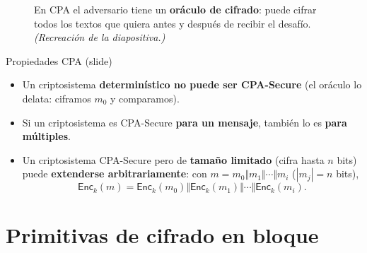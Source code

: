 \documentclass[11pt,a4paper]{article}
\newcommand{\Enc}{\mathsf{Enc}}
\DeclareMathOperator{\negl}{negl}
\newcommand{\E}{\mathsf{e}}
\begin{document}
\begin{figure}[h]
\centering
{}
\caption{En CPA el adversario tiene un \textbf{oráculo de cifrado}: puede cifrar todos los
textos que quiera antes y después de recibir el desafío. \textit{(Recreación de la
diapositiva.)}}
\end{figure}

\begin{defbox}{Propiedades CPA (slide)}
\begin{itemize}[leftmargin=1.4em,itemsep=2pt]
  \item Un criptosistema \textbf{determinístico no puede ser CPA-Secure} (el oráculo lo
        delata: ciframos $m_0$ y comparamos).
  \item Si un criptosistema es CPA-Secure \textbf{para un mensaje}, también lo es
        \textbf{para múltiples}.
  \item Un criptosistema CPA-Secure pero de \textbf{tamaño limitado} (cifra hasta $n$
        bits) puede \textbf{extenderse arbitrariamente}: con
        $m=m_0\Vert m_1\Vert\cdots\Vert m_i$ ($|m_j|=n$ bits),
        \[
          \Enc_k(m) = \Enc_k(m_0)\Vert \Enc_k(m_1)\Vert\cdots\Vert\Enc_k(m_i).
        \]
\end{itemize}
\end{defbox}

\section{Primitivas de cifrado en bloque}\label{sec:bloque}
\end{document}
